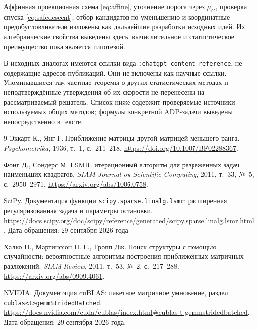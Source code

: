 \documentclass[11pt,a4paper]{article}
\numberwithin{equation}{section}
\theoremstyle{remark}
\newcommand{\src}[1]{\nolinkurl{#1}}
\begin{document}
Аффинная проекционная схема \eqref{eq:affine}, уточнение порога через
$\mu_G$, проверка спуска \eqref{eq:safedescent}, отбор кандидатов по
уменьшению и координатные предобусловливатели изложены как дальнейшие
разработки исходных идей. Их алгебраические свойства выведены здесь;
вычислительное и статистическое преимущество пока является гипотезой.

В исходных диалогах имеются ссылки вида
\src{:chatgpt-content-reference}, не содержащие адресов публикаций.
Они не включены как научные ссылки. Упоминавшиеся там частные теоремы
о других статистических методах и неподтверждённые утверждения об их
скорости не перенесены на рассматриваемый решатель.
Список ниже содержит проверяемые источники используемых общих методов;
формулы конкретной ADP-задачи выведены непосредственно в тексте.

\begin{thebibliography}{9}
Эккарт К., Янг Г. Приближение матрицы другой матрицей меньшего ранга.
\emph{Psychometrika}, 1936, т.~1, с.~211--218.
\url{https://doi.org/10.1007/BF02288367}.

Фонг Д., Сондерс М. LSMR: итерационный алгоритм для разреженных задач
наименьших квадратов. \emph{SIAM Journal on Scientific Computing},
2011, т.~33, №~5, с.~2950--2971.
\url{https://arxiv.org/abs/1006.0758}.

SciPy. Документация функции \src{scipy.sparse.linalg.lsmr}:
расширенная регуляризованная задача и параметры остановки.
\url{https://docs.scipy.org/doc/scipy/reference/generated/scipy.sparse.linalg.lsmr.html}.
Дата обращения: 29 сентября 2026 года.

Халко Н., Мартинссон П.-Г., Тропп Дж.
Поиск структуры с помощью случайности: вероятностные алгоритмы
построения приближённых матричных разложений.
\emph{SIAM Review}, 2011, т.~53, №~2, с.~217--288.
\url{https://arxiv.org/abs/0909.4061}.

NVIDIA. Документация cuBLAS: пакетное матричное умножение,
раздел \src{cublas<t>gemmStridedBatched}.
\url{https://docs.nvidia.com/cuda/cublas/index.html#cublas-t-gemmstridedbatched}.
Дата обращения: 29 сентября 2026 года.
\end{thebibliography}
\end{document}
